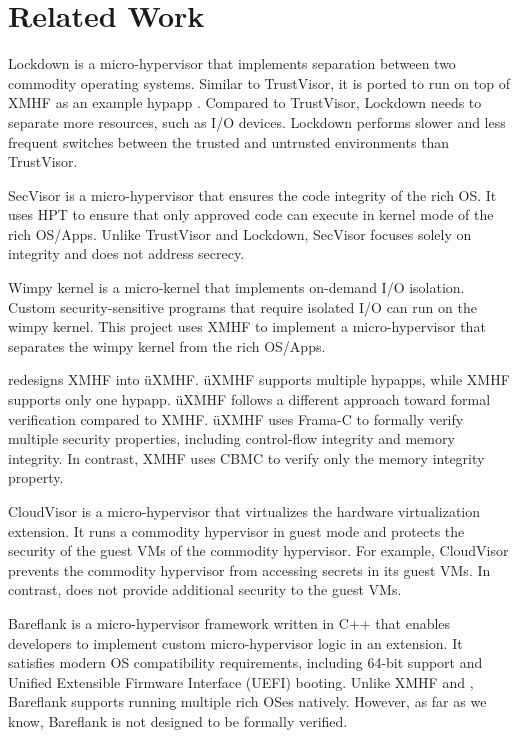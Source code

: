 \section{Related Work}
\label{sec:bg_related_work}

Lockdown \cite{vasudevan2012lockdown} is a micro-hypervisor that implements separation between two commodity operating systems. Similar to TrustVisor, it is ported to run on top of XMHF as an example hypapp \cite{vasudevan2013design}. Compared to TrustVisor, Lockdown needs to separate more resources, such as I/O devices. Lockdown performs slower and less frequent switches between the trusted and untrusted environments than TrustVisor.

SecVisor \cite{seshadri2007secvisor} is a micro-hypervisor that ensures the code integrity of the rich OS. It uses HPT to ensure that only approved code can execute in kernel mode of the rich OS/Apps. Unlike TrustVisor and Lockdown, SecVisor focuses solely on integrity and does not address secrecy.

Wimpy kernel \cite{zhou2014dancing} is a micro-kernel that implements on-demand I/O isolation. Custom security-sensitive programs that require isolated I/O can run on the wimpy kernel. This project uses XMHF to implement a micro-hypervisor that separates the wimpy kernel from the rich OS/Apps.

\cite{vasudevan2016uberspark} redesigns XMHF into {\"u}XMHF. {\"u}XMHF supports multiple hypapps, while XMHF supports only one hypapp. {\"u}XMHF follows a different approach toward formal verification compared to XMHF. {\"u}XMHF uses Frama-C to formally verify multiple security properties, including control-flow integrity and memory integrity. In contrast, XMHF uses CBMC to verify only the memory integrity property.

CloudVisor \cite{zhang2011cloudvisor} is a micro-hypervisor that virtualizes the hardware virtualization extension. It runs a commodity hypervisor in guest mode and protects the security of the guest VMs of the commodity hypervisor. For example, CloudVisor prevents the commodity hypervisor from accessing secrets in its guest VMs. In contrast,  does not provide additional security to the guest VMs.

Bareflank \cite{bareflank} is a micro-hypervisor framework written in C++ that enables developers to implement custom micro-hypervisor logic in an extension. It satisfies modern OS compatibility requirements, including 64-bit support and Unified Extensible Firmware Interface (UEFI) booting. Unlike XMHF and , Bareflank supports running multiple rich OSes natively. However, as far as we know, Bareflank is not designed to be formally verified.

